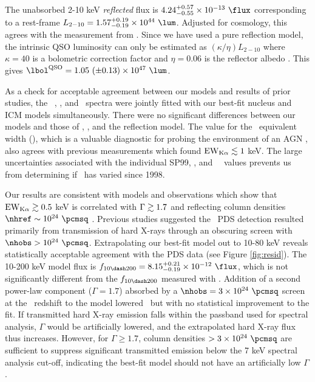 \documentclass[useAMS,usenatbib]{mn2e}
\begin{document}
The unabsorbed 2-10 keV {\it{reflected}} flux is $4.24^{+0.57}_{-0.55}
\times 10^{-13} ~\flux$ corresponding to a rest-frame $L_{2-10} =
1.57^{+0.19}_{-0.19} \times 10^{44} ~\lum$. Adjusted for cosmology,
this agrees with the measurement from
\citet{2001MNRAS.321L..15I}. Since we have used a pure reflection
model, the intrinsic QSO luminosity can only be estimated as
$(\kappa/\eta) L_{2-10}$ where $\kappa = 40$ is a bolometric
correction factor \citep{2007MNRAS.381.1235V} and $\eta = 0.06$ is the
reflector albedo \citep{2009MNRAS.397.1549M}. This gives $\lqso = 1.05
~(\pm 0.13) \times 10^{47} ~\lum$.

As a check for acceptable agreement between our models and results of
prior studies, the \rf\ \chandra, \xmm, and \bepposax\ spectra were
jointly fitted with our best-fit nucleus and ICM models
simultaneously. There were no significant differences between our
models and those of \citet{2000A&A...353..910F},
\citet{2001MNRAS.321L..15I}, and the \citet{2007A&A...473...85P}
reflection model. The value for the \feka\ equivalent width (\fekaew),
which is a valuable diagnostic for probing the environment of an AGN
\citep[see][for a review]{2000PASP..112.1145F}, also agrees with
previous measurements which found $\mathrm{EW}_{\mathrm{K}\alpha} \lesssim 1$ keV. The large
uncertainties associated with the individual SP99, \xmm, and
\bepposax\ \fekaew\ values prevents us from determining if
\fekaew\ has varied since 1998.

Our results are consistent with models and observations which show
that $\mathrm{EW}_{\mathrm{K}\alpha} \gtrsim 0.5$ keV is correlated with $\Gamma \gtrsim 1.7$ and
reflecting column densities $\nhref \sim 10^{24} ~\pcmsq$
\citep{1996MNRAS.280..823M, 1997ApJ...477..602N, 1999MNRAS.303L..11Z,
  2005A&A...444..119G}. Previous studies suggested the \bepposax\ PDS
detection resulted primarily from transmission of hard X-rays through
an obscuring screen with $\nhobs > 10^{24} ~\pcmsq$. Extrapolating our
best-fit model out to 10-80 keV reveals statistically acceptable
agreement with the PDS data (see Figure \ref{fig:resid}). The 10-200
keV model flux is $f_{10 \dash 200} = 8.15^{+0.21}_{-0.19} \times
10^{-12} ~\flux$, which is not significantly different from the $f_{10
  \dash 200}$ measured with \bepposax. Addition of a second power-law
component ($\Gamma = 1.7$) absorbed by a $\nhobs = 3 \times 10^{24}
~\pcmsq$ screen at the \irs\ redshift to the model lowered \chisq\ but
with no statistical improvement to the fit. If transmitted hard X-ray
emission falls within the passband used for spectral analysis,
$\Gamma$ would be artificially lowered, and the extrapolated hard
X-ray flux thus increases. However, for $\Gamma \ge 1.7$, column
densities $> 3 \times 10^{24} ~\pcmsq$ are sufficient to suppress
significant transmitted emission below the 7 keV spectral analysis
cut-off, indicating the best-fit model should not have an artificially
low $\Gamma$.
\end{document}
